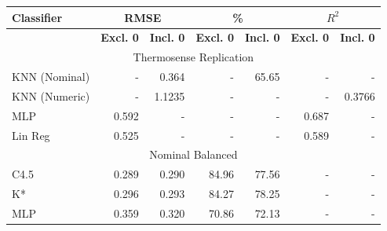 \documentclass[../thesis/thesis.tex]{subfiles}
\begin{document}
\begin{table}
\centering
\begin{tabular}{|l|r|r|r|r|r|r|}
\hline
\textbf{Classifier} & \multicolumn{2}{c|}{\textbf{RMSE}}                                            & \multicolumn{2}{c|}{\textbf{\%}}                                              & \multicolumn{2}{c|}{\textbf{$R^2$}}                                           \\ \hline
                    & \multicolumn{1}{l|}{\textbf{Excl. 0}} & \multicolumn{1}{l|}{\textbf{Incl. 0}} & \multicolumn{1}{l|}{\textbf{Excl. 0}} & \multicolumn{1}{l|}{\textbf{Incl. 0}} & \multicolumn{1}{l|}{\textbf{Excl. 0}} & \multicolumn{1}{l|}{\textbf{Incl. 0}} \\ \hline
\multicolumn{7}{|c|}{Thermosense Replication} \\ \hline                                                                                                                                                                                                                       
KNN (Nominal)       & -                                     & 0.364        & -           & 65.65         & -           & -                                     \\ \hline
KNN (Numeric)       & -                                     & 1.1235       & -           & -             & -           & 0.3766                                \\ \hline
MLP                 & 0.592                                 & -            & -           & -             & 0.687       & -                                     \\ \hline
Lin Reg             & 0.525                                 & -            & -           & -             & 0.589       & -                                     \\ \hline
\multicolumn{7}{|c|}{Nominal Balanced}                                                                                                                         \\ \hline
C4.5                & 0.289                                 & 0.290        & 84.96       & 77.56         & -           & -                                     \\ \hline
K*                  & 0.296                                 & 0.293        & 84.27       & 78.25         & -           & -                                     \\ \hline
MLP                 & 0.359                                 & 0.320        & 70.86       & 72.13         & -           & -                                     \\ \hline

\end{tabular}
\end{table}
\end{document}
